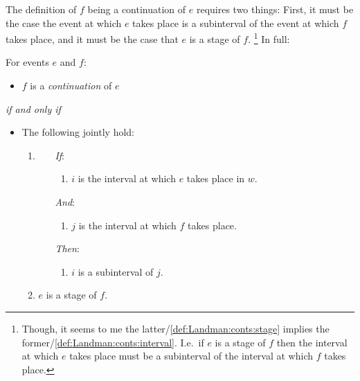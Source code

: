 \begin{note}
  The definition of \(f\) being a continuation of \(e\) requires two things:
  First, it must be the case the event at which \(e\) takes place is a subinterval of the event at which \(f\) takes place, and it must be the case that \(e\) is a stage of \(f\).%
  \footnote{
    Though, it seems to me the latter/\ref{def:Landman:conts:stage} implies the former/\ref{def:Landman:conts:interval}.
    I.e.\ if \(e\) is a stage of \(f\) then the interval at which \(e\) takes place must be a subinterval of the interval at which \(f\) takes place.
  }
  In full:

  \begin{definition}[Continuations]
    \label{def:Landman:conts}
    For events \(e\) and \(f\):
    \begin{itemize}
    \item \(f\) is a \emph{continuation} of \(e\)
    \end{itemize}
    \emph{if and only if}
    \begin{itemize}
    \item
      The following jointly hold:
      \begin{enumerate}[label=\alph*., ref=(\alph*)]
      \item
        \label{def:Landman:conts:interval}
        \begin{enumerate}
        \item[\emph{If}:]
          \begin{enumerate}[label=\roman*.]
          \item
            \(i\) is the interval at which \(e\) takes place in \(w\).
          \end{enumerate}
        \item[\emph{And}:]
          \begin{enumerate}[label=\roman*., resume]
          \item
            \(j\) is the interval at which \(f\) takes place.
          \end{enumerate}
        \item[\emph{Then}:]
          \begin{enumerate}[label=\roman*., resume]
          \item
            \(i\) is a subinterval of \(j\).
          \end{enumerate}
        \end{enumerate}
      \item
        \label{def:Landman:conts:stage}
        \(e\) is a stage of \(f\).
      \end{enumerate}
    \end{itemize}
    \vspace{-\baselineskip}
  \end{definition}
\end{note}


